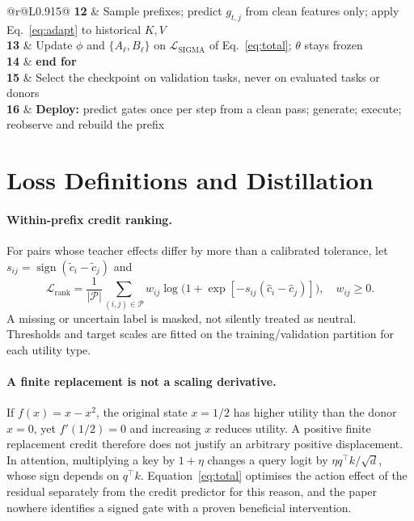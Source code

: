 \documentclass{article}
\begin{document}
\begin{algorithm}[H]
\begin{tabular}{@{}r@{\hspace{0.55em}}L{0.915\linewidth}@{}}
\textbf{12} & \hspace{1.0em}Sample prefixes; predict $g_{t,j}$ from clean features only; apply Eq.~\eqref{eq:adapt} to historical $K,V$\\
\textbf{13} & \hspace{1.0em}Update $\phi$ and $\{A_\ell,B_\ell\}$ on $\mathcal L_{\mathrm{SIGMA}}$ of Eq.~\eqref{eq:total}; $\theta$ stays frozen\\
\textbf{14} & \textbf{end for}\\
\textbf{15} & Select the checkpoint on validation tasks, never on evaluated tasks or donors\\
\textbf{16} & \textbf{Deploy:} predict gates once per step from a clean pass; generate; execute; reobserve and rebuild the prefix\\
\end{tabular}
\end{algorithm}

\section{Loss Definitions and Distillation}
\label{app:loss}
\paragraph{Within-prefix credit ranking.} For pairs whose teacher effects differ
by more than a calibrated tolerance, let $s_{ij}=\operatorname{sign}(\tilde c_i-\tilde c_j)$ and
\begin{equation}
 \mathcal L_{\mathrm{rank}}=
 \frac{1}{|\mathcal P|}\sum_{(i,j)\in\mathcal P}
 w_{ij}\log\big(1+\exp[-s_{ij}(\hat c_i-\hat c_j)]\big),\quad w_{ij}\ge0.
\end{equation}
A missing or uncertain label is masked, not silently treated as neutral.
Thresholds and target scales are fitted on the training/validation partition for
each utility type.

\paragraph{A finite replacement is not a scaling derivative.} If $f(x)=x-x^2$,
the original state $x=1/2$ has higher utility than the donor $x=0$, yet
$f'(1/2)=0$ and increasing $x$ reduces utility. A positive finite replacement
credit therefore does not justify an arbitrary positive displacement. In
attention, multiplying a key by $1+\eta$ changes a query logit by
$\eta q^\top k/\sqrt d$, whose sign depends on $q^\top k$. Equation~\eqref{eq:total}
optimises the action effect of the residual separately from the credit predictor
for this reason, and the paper nowhere identifies a signed gate with a proven
beneficial intervention.
\end{document}
